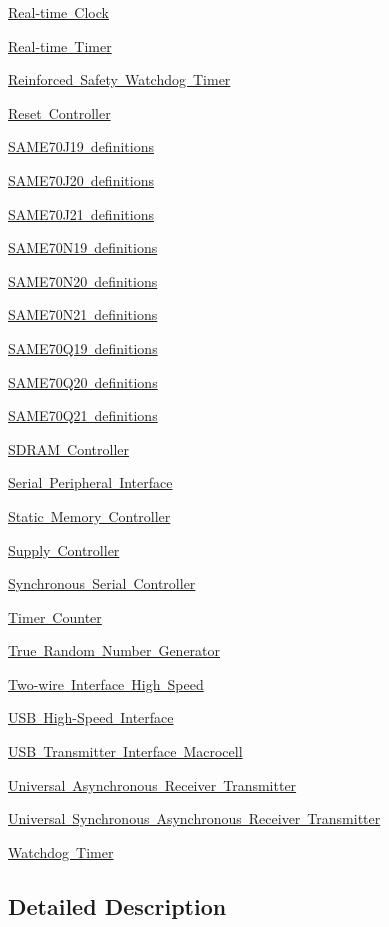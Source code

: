 \begin{DoxyCompactItemize}
\item 
\mbox{\hyperlink{group__SAME70__RTC}{Real-\/time Clock}}
\item 
\mbox{\hyperlink{group__SAME70__RTT}{Real-\/time Timer}}
\item 
\mbox{\hyperlink{group__SAME70__RSWDT}{Reinforced Safety Watchdog Timer}}
\item 
\mbox{\hyperlink{group__SAME70__RSTC}{Reset Controller}}
\item 
\mbox{\hyperlink{group__SAME70J19__definitions}{S\+A\+M\+E70\+J19 definitions}}
\item 
\mbox{\hyperlink{group__SAME70J20__definitions}{S\+A\+M\+E70\+J20 definitions}}
\item 
\mbox{\hyperlink{group__SAME70J21__definitions}{S\+A\+M\+E70\+J21 definitions}}
\item 
\mbox{\hyperlink{group__SAME70N19__definitions}{S\+A\+M\+E70\+N19 definitions}}
\item 
\mbox{\hyperlink{group__SAME70N20__definitions}{S\+A\+M\+E70\+N20 definitions}}
\item 
\mbox{\hyperlink{group__SAME70N21__definitions}{S\+A\+M\+E70\+N21 definitions}}
\item 
\mbox{\hyperlink{group__SAME70Q19__definitions}{S\+A\+M\+E70\+Q19 definitions}}
\item 
\mbox{\hyperlink{group__SAME70Q20__definitions}{S\+A\+M\+E70\+Q20 definitions}}
\item 
\mbox{\hyperlink{group__SAME70Q21__definitions}{S\+A\+M\+E70\+Q21 definitions}}
\item 
\mbox{\hyperlink{group__SAME70__SDRAMC}{S\+D\+R\+A\+M Controller}}
\item 
\mbox{\hyperlink{group__SAME70__SPI}{Serial Peripheral Interface}}
\item 
\mbox{\hyperlink{group__SAME70__SMC}{Static Memory Controller}}
\item 
\mbox{\hyperlink{group__SAME70__SUPC}{Supply Controller}}
\item 
\mbox{\hyperlink{group__SAME70__SSC}{Synchronous Serial Controller}}
\item 
\mbox{\hyperlink{group__SAME70__TC}{Timer Counter}}
\item 
\mbox{\hyperlink{group__SAME70__TRNG}{True Random Number Generator}}
\item 
\mbox{\hyperlink{group__SAME70__TWIHS}{Two-\/wire Interface High Speed}}
\item 
\mbox{\hyperlink{group__SAME70__USBHS}{U\+S\+B High-\/\+Speed Interface}}
\item 
\mbox{\hyperlink{group__SAME70__UTMI}{U\+S\+B Transmitter Interface Macrocell}}
\item 
\mbox{\hyperlink{group__SAME70__UART}{Universal Asynchronous Receiver Transmitter}}
\item 
\mbox{\hyperlink{group__SAME70__USART}{Universal Synchronous Asynchronous Receiver Transmitter}}
\item 
\mbox{\hyperlink{group__SAME70__WDT}{Watchdog Timer}}
\end{DoxyCompactItemize}


\subsection{Detailed Description}
